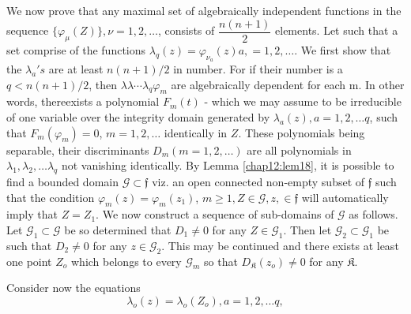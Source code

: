 \medskip
We now prove that any maximal set of algebraically independent
functions in the sequence $\{ \varphi _{\mu} (Z) \}, \nu = 1,2, \ldots
$, consists of $\dfrac{n(n+1)}{2}$ elements. Let such that a set
comprise of the functions $\lambda_q (z) = \varphi_{\nu_{a}} (z) a, =
1,2, \ldots$. We first show that the $\lambda_a ' s$ are at least $n
(n+1)/2$ in number. For if their number is a $q < n (n+1)/2$, then
$\lambda \lambda \cdots \lambda_q \varphi_m$ are algebraically
dependent for each m. In other words, there\pageoriginale exists a
polynomial $F_m 
(t)$ - which we may assume to be irreducible of one variable over the
integrity domain generated by $\lambda_a (z) , a = 1,2, \ldots q$,
such that $F_m (\varphi_m) =0$, $m = 1,2, \ldots$ identically in
$Z$. These polynomials being separable, their discriminants $D_m (m =
1,2, \ldots)$ are all polynomials in $\lambda_1, \lambda_2, \ldots
\lambda_q$ not vanishing identically. By Lemma \ref{chap12:lem18}, it
is possible 
to find  a bounded domain $\mathscr{G} \subset \mathfrak{f}$ viz. an open
connected non-empty subset of $\mathfrak{f}$ such that the condition
$\varphi_m (z) = \varphi_m (z_1)$, $m \geq 1, Z \in \mathscr{G} , z ,\in
\mathfrak{f} $ will automatically imply that $Z = Z_1$. We now
construct a sequence of sub-domains of $\mathscr{G}$ as follows. Let
$\mathscr{G}_1 
\subset \mathscr{G}$ be so determined that $D_1 \neq 0$ for any $Z \in
\mathscr{G}_1$. Then let $\mathscr{G}_2 \subset \mathscr{G}_1$ be such
that $D_2 \neq 0$ for any $z 
\in \mathscr{G}_2$. This may be continued and there exists at least
one point $Z_o$ which belongs to every $\mathscr{G}_m$ so that
$D_\mathfrak{K} (z_o) \neq 0$ for any  $\mathfrak{K}$. 

Consider now the equations
\begin{equation*}
\lambda_o (z) = \lambda_o (Z_o), a = 1,2, \ldots q, \tag{221}\label{eq221} 
\end{equation*}

